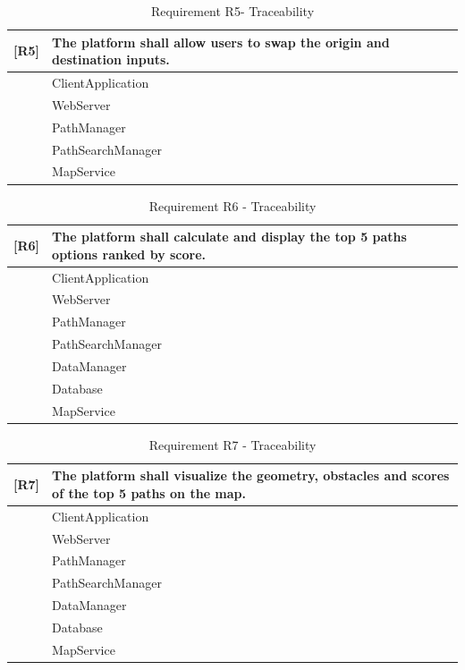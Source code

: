 \begin{table}[H]
    \centering
    \begin{tabular}{|p{1cm}|p{14cm}|}
    \hline
    \textbf{[R5]} & \textbf{The platform shall allow users to swap the origin and destination inputs.} \\ \hline
    [C1] & ClientApplication \\ \hline
    [C2] & WebServer \\ \hline
    [C7] & PathManager \\ \hline
    [C10] & PathSearchManager \\ \hline
    [E2] & MapService \\ \hline
    \end{tabular}
    \caption{Requirement R5- Traceability}
    \label{tab:RT5}
\end{table}

\begin{table}[H]
    \centering
    \begin{tabular}{|p{1cm}|p{14cm}|}
    \hline
    \textbf{[R6]} & \textbf{The platform shall calculate and display the top 5 paths options ranked by score.} \\ \hline
    [C1] & ClientApplication \\ \hline
    [C2] & WebServer \\ \hline
    [C7] & PathManager \\ \hline
    [C10] & PathSearchManager \\ \hline
    [C15] & DataManager\\ \hline
    [C16] & Database\\ \hline
    [E2] & MapService \\ \hline
    \end{tabular}
    \caption{Requirement R6 - Traceability}
    \label{tab:RT6}
\end{table}

\begin{table}[H]
    \centering
    \begin{tabular}{|p{1cm}|p{14cm}|}
    \hline
    \textbf{[R7]} & \textbf{The platform shall visualize the geometry, obstacles and scores of the top 5 paths on the map.} \\ \hline
    [C1] & ClientApplication \\ \hline
    [C2] & WebServer \\ \hline
    [C7] & PathManager \\ \hline
    [C10] & PathSearchManager \\ \hline
    [C15] & DataManager\\ \hline
    [C16] & Database\\ \hline
    [E2] & MapService \\ \hline
    \end{tabular}
    \caption{Requirement R7 - Traceability}
    \label{tab:RT7}
\end{table}

